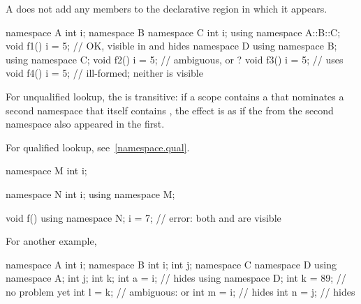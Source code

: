 \pnum
A  does not add any members to the declarative
region in which it appears.
\begin{example}

\begin{codeblock}
namespace A {
  int i;
  namespace B {
    namespace C {
      int i;
    }
    using namespace A::B::C;
    void f1() {
      i = 5;        // OK,  visible in  and hides 
    }
  }
  namespace D {
    using namespace B;
    using namespace C;
    void f2() {
      i = 5;        // ambiguous,  or ?
    }
  }
  void f3() {
    i = 5;          // uses 
  }
}
void f4() {
  i = 5;            // ill-formed; neither  is visible
}
\end{codeblock}
\end{example}

\pnum
For unqualified lookup, the
 is transitive: if a scope contains a
 that nominates a second namespace that itself
contains , the effect is as if the
 from the second namespace also appeared in
the first.
\begin{note} For qualified lookup, see~\ref{namespace.qual}. \end{note}
\begin{example}

\begin{codeblock}
namespace M {
  int i;
}

namespace N {
  int i;
  using namespace M;
}

void f() {
  using namespace N;
  i = 7;            // error: both  and  are visible
}
\end{codeblock}

For another example,

\begin{codeblock}
namespace A {
  int i;
}
namespace B {
  int i;
  int j;
  namespace C {
    namespace D {
      using namespace A;
      int j;
      int k;
      int a = i;    //  hides 
    }
    using namespace D;
    int k = 89;     // no problem yet
    int l = k;      // ambiguous:  or 
    int m = i;      //  hides 
    int n = j;      //  hides 
  }
}
\end{codeblock}
\end{example}


